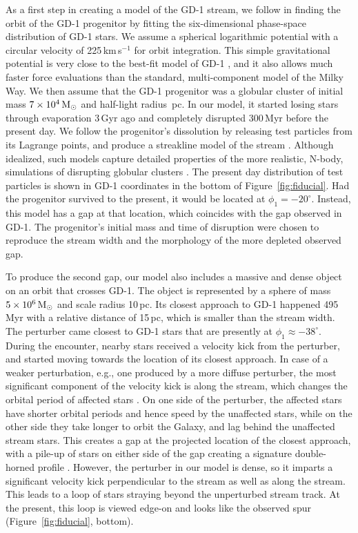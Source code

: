 \documentclass[12pt, modern]{aastex62}
\begin{document}
As a first step in creating a model of the GD-1 stream, we follow \citet{pwb} in finding the orbit of the GD-1 progenitor by fitting the six-dimensional phase-space distribution of GD-1 stars.
We assume a spherical logarithmic potential with a circular velocity of 225\,km\,s$^{-1}$ for orbit integration.
This simple gravitational potential is very close to the best-fit model of GD-1 \citep{koposov2010, bowden2015}, and it also allows much faster force evaluations than the standard, multi-component model of the Milky Way.
We then assume that the GD-1 progenitor was a globular cluster of initial mass $7\times10^4\rm\,M_\odot$ and half-light radius \,pc.
In our model, it started losing stars through evaporation 3\,Gyr ago and completely disrupted 300\,Myr before the present day.
We follow the progenitor's dissolution by releasing test particles from its Lagrange points, and produce a streakline model of the stream \citep{fardal2015}.
Although idealized, such models capture detailed properties of the more realistic, N-body, simulations of disrupting globular clusters \citep{kupper2012}.
The present day distribution of test particles is shown in GD-1 coordinates in the bottom of Figure~\ref{fig:fiducial}.
Had the progenitor survived to the present, it would be located at $\phi_1=-20^\circ$.
Instead, this model has a gap at that location, which coincides with the gap observed in GD-1.
The progenitor's initial mass and time of disruption were chosen to reproduce the stream width and the morphology of the more depleted observed gap.

To produce the second gap, our model also includes a massive and dense object on an orbit that crosses GD-1.
The object is represented by a \citet{hernquist1990} sphere of mass $5\times10^6\rm\,M_\odot$ and scale radius 10\,pc.
Its closest approach to GD-1 happened 495\,Myr with a relative distance of 15\,pc, which is smaller than the stream width.
The perturber came closest to GD-1 stars that are presently at $\phi_1\approx-38^\circ$.
During the encounter, nearby stars received a velocity kick from the perturber, and started moving towards the location of its closest approach.
In case of a weaker perturbation, e.g., one produced by a more diffuse perturber, the most significant component of the velocity kick is along the stream, which changes the orbital period of affected stars \citep{eb2015}.
On one side of the perturber, the affected stars have shorter orbital periods and hence speed by the unaffected stars, while on the other side they take longer to orbit the Galaxy, and lag behind the unaffected stream stars.
This creates a gap at the projected location of the closest approach, with a pile-up of stars on either side of the gap creating a signature double-horned profile \citep{carlberg2012}.
However, the perturber in our model is dense, so it imparts a significant velocity kick perpendicular to the stream as well as along the stream.
This leads to a loop of stars straying beyond the unperturbed stream track.
At the present, this loop is viewed edge-on and looks like the observed spur (Figure~\ref{fig:fiducial}, bottom).
\end{document}
